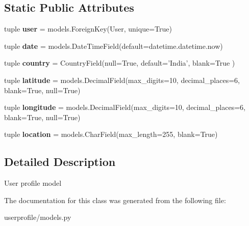 \subsection*{Static Public Attributes}
\begin{DoxyCompactItemize}
\item 
\hypertarget{classsouvenir_1_1userprofile_1_1models_1_1BaseProfile_aa73169b9b706da9679e18895473a66e7}{tuple {\bfseries user} = models.\-Foreign\-Key(User, unique=True)}\label{classsouvenir_1_1userprofile_1_1models_1_1BaseProfile_aa73169b9b706da9679e18895473a66e7}

\item 
\hypertarget{classsouvenir_1_1userprofile_1_1models_1_1BaseProfile_ac92d73c27ff843ee42436ee199d03280}{tuple {\bfseries date} = models.\-Date\-Time\-Field(default=datetime.\-datetime.\-now)}\label{classsouvenir_1_1userprofile_1_1models_1_1BaseProfile_ac92d73c27ff843ee42436ee199d03280}

\item 
\hypertarget{classsouvenir_1_1userprofile_1_1models_1_1BaseProfile_af60a0c4018b90abd8137927ac962a55b}{tuple {\bfseries country} = Country\-Field(null=True, default='India', blank=True )}\label{classsouvenir_1_1userprofile_1_1models_1_1BaseProfile_af60a0c4018b90abd8137927ac962a55b}

\item 
\hypertarget{classsouvenir_1_1userprofile_1_1models_1_1BaseProfile_a0e220293e3dd689c891f61e6b738a2be}{tuple {\bfseries latitude} = models.\-Decimal\-Field(max\-\_\-digits=10, decimal\-\_\-places=6, blank=True, null=True)}\label{classsouvenir_1_1userprofile_1_1models_1_1BaseProfile_a0e220293e3dd689c891f61e6b738a2be}

\item 
\hypertarget{classsouvenir_1_1userprofile_1_1models_1_1BaseProfile_aa2a4c732622ed1d8d022b30cdac21c6a}{tuple {\bfseries longitude} = models.\-Decimal\-Field(max\-\_\-digits=10, decimal\-\_\-places=6, blank=True, null=True)}\label{classsouvenir_1_1userprofile_1_1models_1_1BaseProfile_aa2a4c732622ed1d8d022b30cdac21c6a}

\item 
\hypertarget{classsouvenir_1_1userprofile_1_1models_1_1BaseProfile_a8a761c4abd489417d3935f1cdfdcdfb5}{tuple {\bfseries location} = models.\-Char\-Field(max\-\_\-length=255, blank=True)}\label{classsouvenir_1_1userprofile_1_1models_1_1BaseProfile_a8a761c4abd489417d3935f1cdfdcdfb5}

\end{DoxyCompactItemize}


\subsection{Detailed Description}
\begin{DoxyVerb}User profile model
\end{DoxyVerb}
 

The documentation for this class was generated from the following file\-:\begin{DoxyCompactItemize}
\item 
userprofile/models.\-py\end{DoxyCompactItemize}
